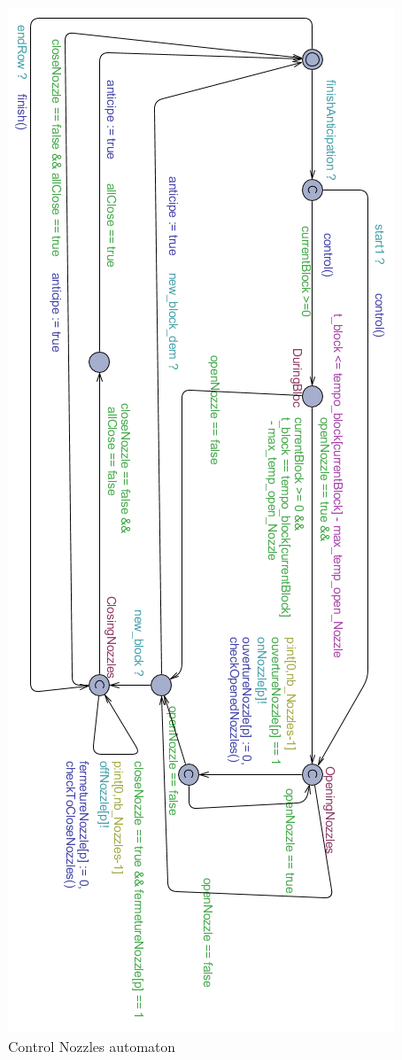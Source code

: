\begin{figure}[h!] 
\begin{center}
\includegraphics[scale = 0.7]{ControlBuse.png}
\caption{Control Nozzles automaton} 
\label{fig:CtrNozzle}
\end{center}
\end{figure}




